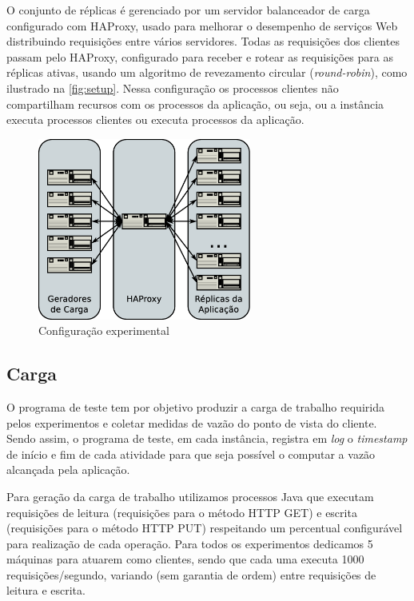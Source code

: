 O conjunto de réplicas é gerenciado por um servidor balanceador de carga configurado com
HAProxy, usado para melhorar o desempenho de serviços Web distribuindo requisições entre
vários servidores. Todas as requisições dos clientes passam pelo HAProxy, configurado para
receber e rotear as requisições para as réplicas ativas, usando um algoritmo de
revezamento circular (\emph{round-robin}), como ilustrado na \autoref{fig:setup}. Nessa
configuração os processos clientes não compartilham recursos com os processos da
aplicação, ou seja, ou a instância executa processos clientes ou executa processos da
aplicação.

\begin{figure}[ht]
  \centering
  \includegraphics[width=7cm]{conteudo/capitulos/figuras/experimental-setup.dia.eps}
  \caption{Configuração experimental}
  \label{fig:setup}
\end{figure}

\subsection{Carga}

O programa de teste tem por objetivo produzir a carga de trabalho requirida pelos
experimentos e coletar medidas de vazão do ponto de vista do cliente. Sendo assim, o
programa de teste, em cada instância, registra em \emph{log} o \emph{timestamp} de início
e fim de cada atividade para que seja possível o computar a vazão alcançada pela
aplicação.

Para geração da carga de trabalho utilizamos processos Java que executam requisições de
leitura (requisições para o método HTTP GET) e escrita (requisições para o método HTTP
PUT) respeitando um percentual configurável para realização de cada operação. Para todos
os experimentos dedicamos 5 máquinas para atuarem como clientes, sendo que cada uma
executa 1000 requisições/segundo, variando (sem garantia de ordem) entre requisições de
leitura e escrita.

